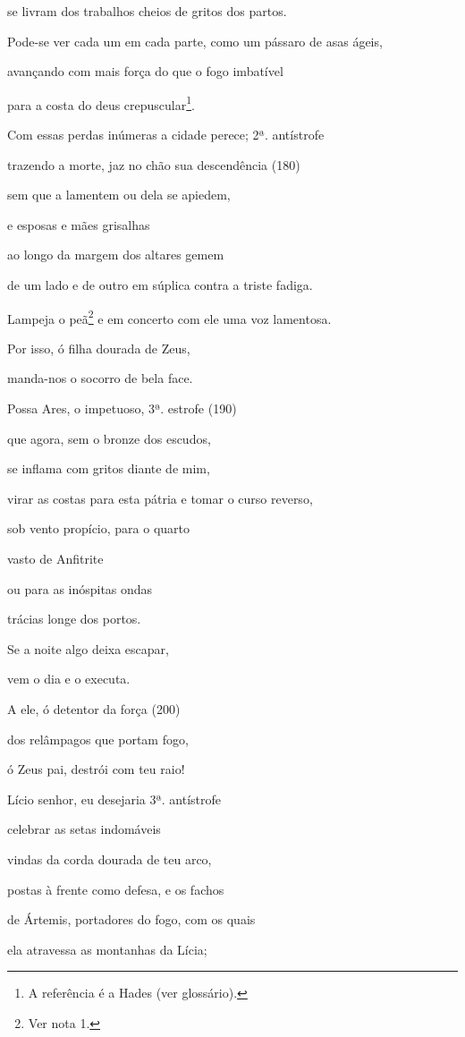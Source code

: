 se livram dos trabalhos cheios de gritos dos partos.

Pode-se ver cada um em cada parte, como um pássaro de asas ágeis,

avançando com mais força do que o fogo imbatível

para a costa do deus crepuscular\footnote{A referência é a Hades (ver
  glossário).}.

Com essas perdas inúmeras a cidade perece; 2ª. antístrofe

trazendo a morte, jaz no chão sua descendência (180)

sem que a lamentem ou dela se apiedem,

e esposas e mães grisalhas

ao longo da margem dos altares gemem

de um lado e de outro em súplica contra a triste fadiga.

Lampeja o peã\footnote{Ver nota 1.} e em concerto com ele uma voz
lamentosa.

Por isso, ó filha dourada de Zeus,

manda-nos o socorro de bela face.

Possa Ares, o impetuoso, 3ª. estrofe (190)

que agora, sem o bronze dos escudos,

se inflama com gritos diante de mim,

virar as costas para esta pátria e tomar o curso reverso,

sob vento propício, para o quarto

vasto de Anfitrite

ou para as inóspitas ondas

trácias longe dos portos.

Se a noite algo deixa escapar,

vem o dia e o executa.

A ele, ó detentor da força (200)

dos relâmpagos que portam fogo,

ó Zeus pai, destrói com teu raio!

Lício senhor, eu desejaria 3ª. antístrofe

celebrar as setas indomáveis

vindas da corda dourada de teu arco,

postas à frente como defesa, e os fachos

de Ártemis, portadores do fogo, com os quais

ela atravessa as montanhas da Lícia;

